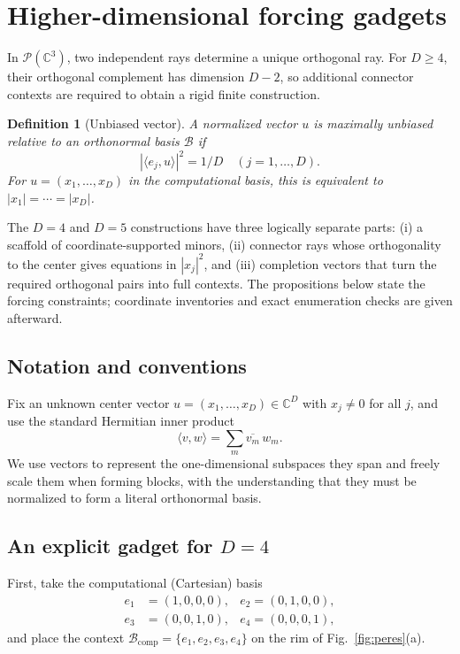 \documentclass[%
  reprint,
  superscriptaddress,
  showpacs,
  showkeys,
  amsmath,amssymb,
  pra,
  longbibliography,
  floatfix,
  x11names
]{revtex4-2}
\newcommand{\rev}[1]{{#1}}
\newenvironment{revision}{\begingroup}{\endgroup}
\newtheorem{definition}{Definition}
\begin{document}




\section{Higher-dimensional forcing gadgets}
\label{2025-hdfg}

\begin{revision}
In $\mathcal{P}(\mathbb{C}^3)$, two independent rays determine a unique orthogonal ray.  For $D\geq4$, their orthogonal complement has dimension $D-2$, so additional connector contexts are required to obtain a rigid finite construction.

\begin{definition}[Unbiased vector]
\label{def:unbiased}
A normalized vector $u$ is maximally unbiased relative to an orthonormal basis $\mathcal{B}$ if
\[
|\langle e_j,u\rangle|^2=1/D\quad (j=1,\ldots,D).
\]
For $u=(x_1,\ldots,x_D)$ in the computational basis, this is equivalent to \ensuremath{|x_1|=\cdots=|x_D|}.
\end{definition}

The $D=4$ and $D=5$ constructions have three logically separate parts: (i) a scaffold of coordinate-supported minors, (ii) connector rays whose orthogonality to the center gives equations in $|x_j|^2$, and (iii) completion vectors that turn the required orthogonal pairs into full contexts.  The propositions below state the forcing constraints; coordinate inventories and exact enumeration checks are given afterward.
\end{revision}

\subsection{Notation and conventions}
Fix an unknown center vector $u = (x_1,\dots,x_D) \in \mathbb{C}^D$ with $x_j \ne 0$ for all $j$, and use the standard Hermitian inner product
\[
\langle v,w\rangle = \sum_m \overline{v_m}\, w_m.
\]
We use vectors to represent the one-dimensional subspaces they span and freely scale them when forming blocks,
with the understanding that they must be normalized to form a literal orthonormal basis.

\subsection{An explicit gadget for $D=4$}

\rev{First, take the computational (Cartesian) basis}
\begin{align*}
e_1&=(1,0,0,0), &
e_2 =(0,1,0,0),\\
e_3&=(0,0,1,0), &
e_4 =(0,0,0,1),
\end{align*}
\rev{and place the context $\mathcal{B}_{\mathrm{comp}}=\{e_1,e_2,e_3,e_4\}$ on the rim of Fig.~\ref{fig:peres}(a).}
\end{document}
